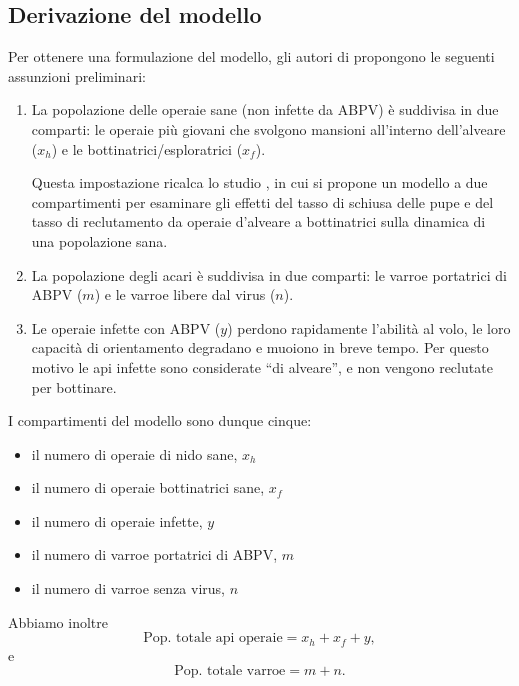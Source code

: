 \subsection{Derivazione del modello}
Per ottenere una formulazione del modello, gli autori di \cite{ratti2017} propongono le seguenti assunzioni preliminari:
\begin{enumerate}
    \item La popolazione delle operaie sane (non infette da ABPV) è suddivisa in due comparti: le operaie più giovani che svolgono mansioni all'interno dell'alveare ($x_h$) e le bottinatrici/esploratrici ($x_f$).

    Questa impostazione ricalca lo studio \cite{khoury2011}, in cui si propone un modello a due compartimenti per esaminare gli effetti del tasso di schiusa delle pupe e del tasso di reclutamento da operaie d'alveare a bottinatrici sulla dinamica di una popolazione sana.
    \item La popolazione degli acari è suddivisa in due comparti: le varroe portatrici di ABPV ($m$) e le varroe libere dal virus ($n$).
    \item Le operaie infette con ABPV ($y$) perdono rapidamente l'abilità al volo, le loro capacità di orientamento degradano e muoiono in breve tempo. Per questo motivo le api infette sono considerate ``di alveare'', e non vengono reclutate per bottinare.
\end{enumerate}

I compartimenti del modello sono dunque cinque:
\begin{itemize}
    \item il numero di operaie di nido sane, $x_h$
    \item il numero di operaie bottinatrici sane, $x_f$
    \item il numero di operaie infette, $y$
    \item il numero di varroe portatrici di ABPV, $m$
    \item il numero di varroe senza virus, $n$
\end{itemize}

Abbiamo inoltre
$$\text{Pop. totale api operaie} = x_h + x_f + y,$$
e
$$\text{Pop. totale varroe} = m + n.$$

